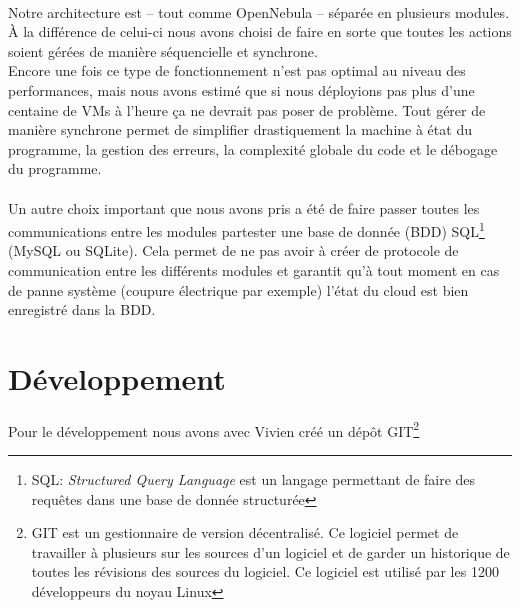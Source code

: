 \paragraph*{}
Notre architecture est -- tout comme OpenNebula -- séparée en plusieurs modules. À la différence de celui-ci nous avons choisi de faire en sorte que toutes les actions soient gérées
de manière séquencielle et synchrone.\\ %
Encore une fois ce type de fonctionnement n'est pas optimal au niveau des performances, mais nous avons estimé que si nous déployions pas plus d'une centaine de VMs à
l'heure ça ne devrait pas poser de problème.
Tout gérer de manière synchrone permet de simplifier drastiquement la machine à état du programme, la gestion des erreurs, la complexité globale du code et le débogage
du programme.

\paragraph*{}
Un autre choix important que nous avons pris a été de faire passer toutes les communications entre les modules partester une base de donnée (BDD)
SQL\footnote{SQL: \emph{Structured Query Language} est un langage permettant de faire des requêtes dans une base de donnée structurée} (MySQL ou SQLite).
Cela permet de ne pas avoir à créer de protocole de communication entre les différents modules et garantit qu'à tout moment en cas de panne système (coupure électrique
par exemple) l'état du cloud est bien enregistré dans la BDD.

\section{Développement}

\paragraph*{}
Pour le développement nous avons avec Vivien créé un dépôt GIT\footnote{GIT est un gestionnaire de version décentralisé. Ce logiciel permet de travailler à plusieurs
sur les sources d'un logiciel et de garder un historique de toutes les révisions des sources du logiciel. Ce logiciel est utilisé par les 1200 développeurs du noyau Linux}

